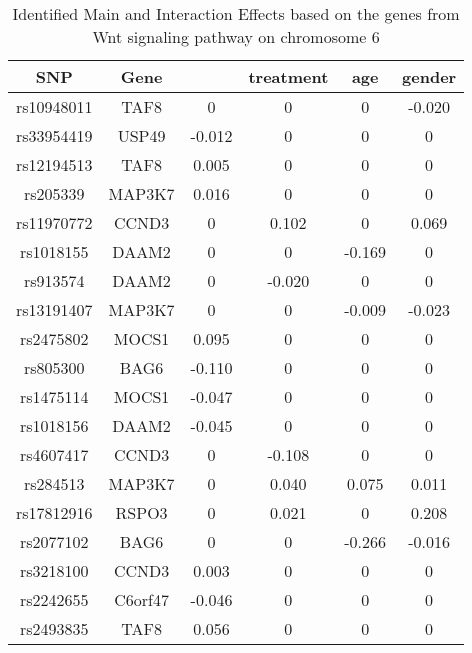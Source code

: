 \documentclass[12pt]{article}
\begin{document}
\begin{longtable} [ht!]{c c c c c c}
	\caption{Identified Main and Interaction Effects based on the genes from Wnt signaling pathway on chromosome 6}\label{tab:5}\\
	
	\hline
	SNP&Gene&&treatment&age&gender\\
	
	\hline
	rs10948011&TAF8	&0&	0&	0&	-0.020\\
	
	rs33954419&USP49	&-0.012&	0&	0&	0\\
	
	rs12194513&TAF8	&0.005&	0&	0&0\\
	
	rs205339	&MAP3K7 &0.016&	0&	0&	0\\
	
	rs11970772&CCND3	&0&	0.102&	0&	0.069\\
	
	rs1018155&DAAM2	&0&	0&	-0.169&0\\
	
	rs913574&DAAM2	&0&	-0.020&	0&	0\\
	
	rs13191407&MAP3K7	&0&	0&	-0.009&	-0.023\\
	
	rs2475802&MOCS1	&0.095&	0&	0&	0\\
	
	rs805300&BAG6	&-0.110&	0&	0&	0\\
	
	rs1475114&MOCS1	&-0.047&	0&	0&	0\\
	
	rs1018156&DAAM2	&-0.045&	0&	0&	0\\
	
	rs4607417&CCND3	&0&	-0.108&	0&	0\\
	
	rs284513&MAP3K7	&0&	0.040&	0.075&	0.011\\
	
	rs17812916&RSPO3	&0&	0.021&	0&	0.208\\
	
	rs2077102&BAG6	&0&	0&	-0.266&	-0.016\\
	
	rs3218100&CCND3	&0.003&	0&	0&	0\\
	
	rs2242655&C6orf47	&-0.046&	0&	0&	0\\
	
	rs2493835&TAF8	&0.056&	0&	0&	0\\
	

\end{longtable}
\end{document}

